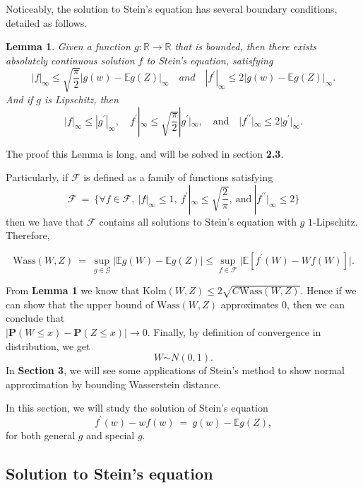 \documentclass[12pt]{article}
\newcommand{\eq }{\: = \:}
\newtheorem{lemma}{Lemma}
\theoremstyle{nonumberplain}
\begin{document}
Noticeably, the solution to Stein's equation has several boundary conditions, detailed as follows.

\begin{lemma}
Given a function $g: \mathbb{R} \rightarrow \mathbb{R}$ that is bounded, then there exists absolutely continuous solution $f$ to Stein's equation, satisfying
$$
|f|_{\infty}\leq \sqrt{\frac{\pi}{2}}|g(w)-\mathbb{E}g(Z)|_{\infty}\quad and\quad |f^{\prime}|_{\infty}\leq 2|g(w)-\mathbb{E}g(Z)|_{\infty}.
$$ 
And if $g$ is {\it Lipschitz\/}, then
$$
|f|_{\infty} \leq |g^{\prime}|_{\infty}, \quad f^{\prime}|_{\infty} \leq \sqrt{\frac{\pi}{2}}|g^{\prime}|_{\infty}, \quad \mbox{and}\quad |f^{\prime \prime}|_{\infty} \leq 2|g^{\prime}|_{\infty}.
$$
\end{lemma}

The proof this Lemma is long, and will be solved in section \textbf{2.3}.

Particularly, if $\mathcal{F}$ is defined as a family of functions satisfying
$$
\mathcal{F}\eq \{\forall f\in \mathcal{F}, \ |f|_{\infty} \leq 1, \ f^{\prime}|_{\infty} \leq \sqrt{\frac{2}{\pi}}, \ \mbox{and}\ |f^{\prime \prime}|_{\infty} \leq 2 \}
$$
then we have that $\mathcal{F}$ contains all solutions to Stein's equation with $g$ $1$-Lipschitz. Therefore, 

\begin{equation}
\mathrm{Wass}(W,Z)\eq \sup\limits_{g\in \mathcal{G}}\bigl|\mathbb{E}g(W)-\mathbb{E}g(Z) \bigr| \leq \sup \limits_{f\in \mathcal{F}} \bigl|\mathbb{E}[f^{\prime}(W)-Wf(W)]\bigr|.
\end{equation}

From \textbf{Lemma 1} we know that $\mathrm{Kolm}(W,Z)\leq  2\sqrt{C\mathrm{Wass}(W,Z)}$. Hence if we can show that the upper bound of $\mathrm{Wass}(W,Z)$ approximates $0$, then we can conclude that\\ $|\textbf{P}(W\leq x)-\textbf{P}(Z\leq x)| \rightarrow 0$. Finally, by definition of convergence in distribution, we get 
$$
W\overset{\cdot}{\sim} N(0,1).
$$
In \textbf{Section 3}, we will see some applications of Stein's method to show normal approximation by bounding Wasserstein distance.

In this section, we will study the solution of Stein's equation
$$
f^{\prime}(w)-wf(w)\eq g(w)-\mathbb{E}g(Z),
$$
for both general $g$ and special $g$.
\subsection{Solution to Stein's equation}
\end{document}
